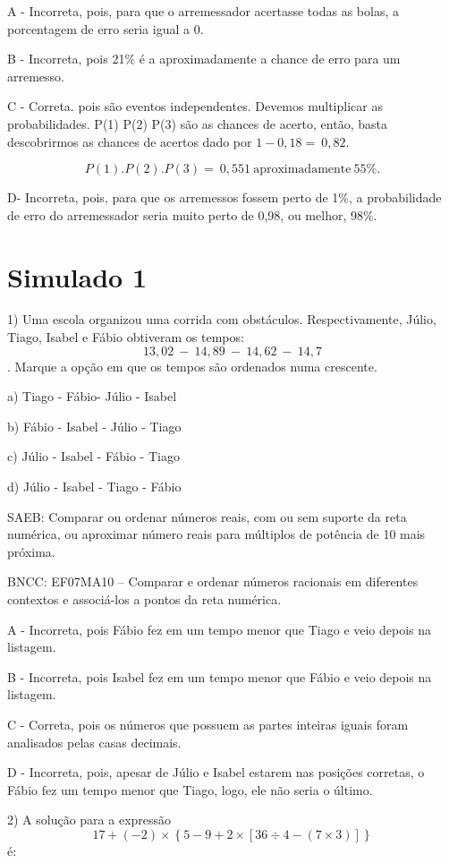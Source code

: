 A - Incorreta, pois, para que o arremessador acertasse todas as bolas, a
porcentagem de erro seria igual a 0.

B - Incorreta, pois 21\% é a aproximadamente a chance de erro para um
arremesso.

C - Correta. pois são eventos independentes. Devemos multiplicar as
probabilidades. P(1) P(2) P(3) são as chances de acerto, então, basta
descobrirmos as chances de acertos dado por \(1 - 0,18 = \ 0,82.\)

\[P(1).P(2).P(3) = \ 0,551\ \text{aproximadamente}\ 55\%.\]

D- Incorreta, pois, para que os arremessos fossem perto de 1\%, a
probabilidade de erro do arremessador seria muito perto de 0,98, ou
melhor, 98\%.

\hypertarget{simulado-1}{%
\section{Simulado 1}\label{simulado-1}}

1) Uma escola organizou uma corrida com obstáculos. Respectivamente,
Júlio, Tiago, Isabel e Fábio obtiveram os tempos:
\[13,02\  - \ 14,89\  - \ 14,62\  - \ 14,7\]. Marque a opção em que os
tempos são ordenados numa crescente.~

a) Tiago - Fábio- Júlio - Isabel

b) Fábio - Isabel - Júlio - Tiago

c) Júlio - Isabel - Fábio - Tiago

d) Júlio - Isabel - Tiago - Fábio

SAEB: Comparar ou ordenar números reais, com ou sem suporte da reta
numérica, ou aproximar número reais para múltiplos de potência de 10
mais próxima.

BNCC: EF07MA10 -- Comparar e ordenar números racionais em diferentes
contextos e associá-los a pontos da reta numérica.

A - Incorreta, pois Fábio fez em um tempo menor que Tiago e veio depois
na listagem.

B - Incorreta, pois Isabel fez em um tempo menor que Fábio e veio depois
na listagem.

C - Correta, pois os números que possuem as partes inteiras iguais foram
analisados pelas casas decimais.

D - Incorreta, pois, apesar de Júlio e Isabel estarem nas posições
corretas, o Fábio fez um tempo menor que Tiago, logo, ele não seria o
último.

2) A solução para a expressão
\[17 + ( - 2) \times \left\{ 5 - 9 + 2 \times \left\lbrack 36 \div 4 - \left( 7 \times 3 \right) \right\rbrack \right\}\]
é:

